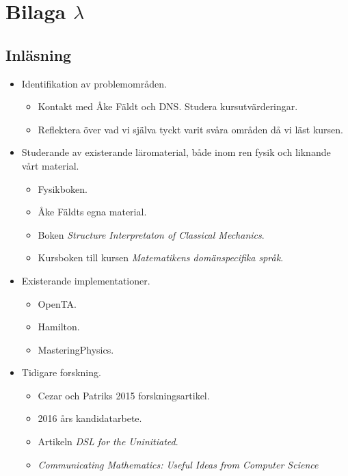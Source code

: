 \chapter{Bilaga $\lambda$}

\section*{Inläsning}

\begin{itemize}
    \item Identifikation av problemområden.
        \begin{itemize}
            \item Kontakt med Åke Fäldt och DNS. Studera kursutvärderingar.
            \item Reflektera över vad vi själva tyckt varit svåra områden då vi
          läst kursen.  \end{itemize}
    \item Studerande av existerande läromaterial, både inom ren fysik och liknande vårt material.
        \begin{itemize}
            \item Fysikboken.
            \item Åke Fäldts egna material.
            \item Boken \textit{Structure Interpretaton of Classical Mechanics}\cite{SICM}.
            \item Kursboken till kursen \textit{Matematikens domänspecifika språk}.
        \end{itemize}
    \item Existerande implementationer.
        \begin{itemize}
            \item OpenTA.
            \item Hamilton.
            \item MasteringPhysics.
        \end{itemize}
    \item Tidigare forskning.
        \begin{itemize}
            \item Cezar och Patriks 2015 forskningsartikel.
            \item 2016 års kandidatarbete.
            \item Artikeln \textit{DSL for the Uninitiated}.
            \item \textit{Communicating Mathematics: Useful Ideas from Computer Science}
        \end{itemize}
\end{itemize}

